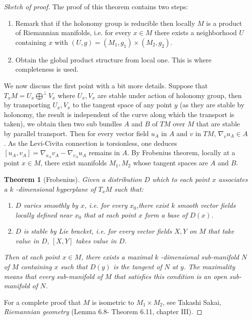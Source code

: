 \documentclass[11pt]{article}
\newtheorem{theorem}{Theorem}
\begin{document}
\begin{proof}[Sketch of proof]
The proof of this theorem contains two steps:
\begin{enumerate}
\item Remark that if the holonomy group is reducible then locally \(M\) is a product of Riemannian
manifolds, i.e. for every \(x\in M\) there exists a neighborhood \(U\) containing \(x\) with
\((U,g)=(M_1,g_1)\times (M_2,g_2)\).
\item Obtain the global product structure from local one. This is where completeness is used.
\end{enumerate}


We now discuss the first point with a bit more details. Suppose that \(T_xM = U_x \bigoplus^\perp
V_x\) where \(U_x, V_x\) are stable under action of holonomy group, then by transporting \(U_x, V_x\) to
the tangent space of any point \(y\) (as they are stable by holonomy, the result is independent of the
curve along which the transport is taken), we obtain then two sub bundles \(A\) and \(B\) of \(TM\) over
\(M\) that are stable by parallel transport. Then for every vector field \(u_A\) in \(A\) and \(v\) in \(TM\),
\(\nabla_v u_A \in A\). As the Levi-Civita connection is torsionless, one deduces \([u_A,v_A] =
\nabla_{u_A}v_A - \nabla_{v_A}u_A\) remains in \(A\). By Frobenius theorem, locally at a point \(x\in
M\), there exist manifolds \(M_1, M_2\) whose tangent spaces are \(A\) and \(B\).


\begin{theorem}[Frobenius]
\label{thm:Frobenius}
\label{org1837154}
Given a distribution \(D\) which to each point \(x\) associates a \(k\) -dimensional hyperplane of \(T_xM\)
such that:
\begin{enumerate}
\item \(D\) varies smoothly by \(x\), i.e. for every \(x_0\),there exist \(k\) smooth vector fields locally
defined near \(x_0\) that at each point \(x\) form a base of \(D(x)\).
\item \(D\) is stable by Lie bracket, i.e. for every vector fields \(X,Y\) on \(M\) that take value in \(D\),
\([X,Y]\) takes value in \(D\).
\end{enumerate}
Then at each point \(x\in M\), there exists a maximal \(k\) -dimensional sub-manifold \(N\) of \(M\) containing
\(x\) such that \(D(y)\) is the tangent of \(N\) at \(y\). The maximality means that every sub-manifold of
\(M\) that satisfies this condition is an open sub-manifold of \(N\).
\end{theorem}
For a complete proof that \(M\) is isometric to \(M_1\times M_2\), see Takashi Sakai, \emph{Riemannian
geometry} (Lemma 6.8- Theorem 6.11, chapter III).
\end{proof}
\end{document}
